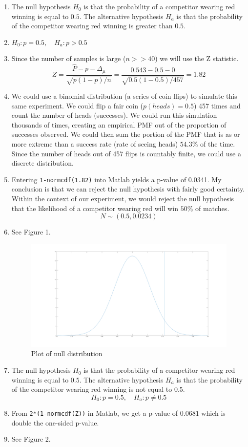 \documentclass{article}
\begin{document}
\begin{enumerate}[label=\alph*.]
    \item The null hypothesis $H_0$ is that the probability of a competitor wearing red winning is equal to $0.5$. The alternative hypothesis $H_a$ is that the probability of the competitor wearing red winning is greater than $0.5$.
    \item $H_0: p = 0.5, \quad H_a: p > 0.5$
    \item Since the number of samples is large ($n>>40$) we will use the Z statistic. 
        $$Z = \frac{\hat{P} - p - \Delta_\mu}{\sqrt{p(1-p)/n}}=\frac{0.543 - 0.5 - 0}{\sqrt{0.5(1-0.5)/457}}=1.82$$
    \item We could use a binomial distribution (a series of coin flips) to simulate this same experiment. We could flip a fair coin ($p(heads)=0.5$) 457 times and count the number of heads (successes). We could run this simulation thousands of times, creating an empirical PMF out of the proportion of successes observed. We could then sum the portion of the PMF that is as or more extreme than a success rate (rate of seeing heads) $54.3\%$ of the time. Since the number of heads out of 457
        flips is countably finite, we could use a discrete distribution.
    \item Entering \texttt{1-normcdf(1.82)} into Matlab yields a p-value of 0.0341. My conclusion is that we can reject the null hypothesis with fairly good certainty. Within the context of our experiment, we would reject the null hypothesis that the likelihood of a competitor wearing red will win $50\%$ of matches.
        $$ N \sim(0.5, 0.0234)$$
    \item See Figure 1.
\begin{figure}[ht]
\begin{center}
    \includegraphics[scale=0.2]{fig1}
    \caption{Plot of null distribution}
\end{center}
\end{figure}
    \item The null hypothesis $H_0$ is that the probability of a competitor wearing red winning is equal to $0.5$. The alternative hypothesis $H_a$ is that the probability of the competitor wearing red winning is not equal to $0.5$.
        $$H_0: p = 0.5, \quad H_a: p \neq 0.5$$
    \item From \texttt{2*(1-normcdf(Z))} in Matlab, we get a p-value of $0.0681$ which is double the one-sided p-value.
    \item See Figure 2.


\end{enumerate}
\end{document}
